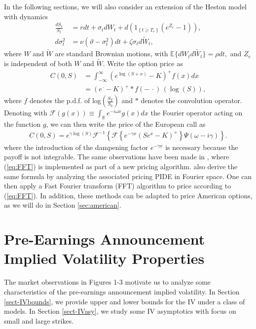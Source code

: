 \documentclass[11pt]{article}
\numberwithin{equation}{section}
\numberwithin{theorem}{section}
\begin{document}
In the following sections, we will also consider an extension of the
Heston model with dynamics
\begin{align}
\frac{dS_{t}}{S_{t}} & =r dt+\sigma_{t}dW_{t}+d\left(1_{\left\{ t\geq T_{e}\right\} }\left(e^{Z_{e}}-1\right)\right),\nonumber \\
d\sigma_{t}^{2} & = \nu \left(\vartheta-\sigma_{t}^{2}\right)dt+\zeta\sigma_{t}d\tilde{W}_{t},\label{eq:heston_dyn}
\end{align}
where $W$ and $\tilde{W}$ are standard Brownian motions, with $\mathbb{E}\{dW_{t}d\tilde{W_{t}}\}=\rho dt,$
and $Z_{e}$ is independent of both $W$ and $\tilde{W}$. Write the option price as
\begin{align*}
C\left(0,S\right) & =  \int_{-\infty}^{\infty}\left(e^{{\log}\left(S+x\right)}-K\right)^+f(x)dx \\
& =  \left(e^{\,\cdot}-K\right)^+\ast f(-\,\cdot)\,\left({\log}(S)\right),
\end{align*} 
where $f$ denotes the p.d.f. of log$(\frac{S_T}{S_0})$ and $\ast$ denotes the convolution operator. 
Denoting with
$\mathcal{F}\left(g\left(x\right)\right)\equiv\int_{\mathbb{R}}e^{-i\omega x}g\left(x\right)dx$
the Fourier operator acting on the function $g$, we can then write the
price of the European call as 
\begin{eqnarray}
C\left(0,S\right)=e^{\gamma {\log}(S)}\mathcal{F}^{-1}\left\{\mathcal{F}\left\{e^{-\gamma x}\left(Se^{x}-K\right)^{+}\right\}\Psi\left(\omega-i\gamma\right)\right\}.\label{eq:FFT}
\end{eqnarray}
where the introduction of the dampening factor $e^{-\gamma x}$ is necessary because the payoff is not integrable. The same observations have been  made in \citet{Lord08afast}, where    (\ref{eq:FFT}) is implemented as part of a new  pricing algorithm. \citet{Jackson2008} also derive the same formula by analyzing the associated pricing PIDE in Fourier space. One can then apply a Fast Fourier transform (FFT) algorithm to price according to (\ref{eq:FFT}). In addition,  these methods can be adapted to price American options, as we will do in Section \ref{sec:american}.


\section{Pre-Earnings Announcement Implied Volatility Properties\label{sec:IV}}\label{sect-IVbehave}
The market observations in Figures 1-3 motivate us to   analyze some characteristics of the pre-earnings announcement implied volatility.  In Section \ref{sect-IVbounds}, we provide  upper and lower
bounds for the IV under a class of models.  
In Section \ref{sect-IVasy},  we study some IV asymptotics  with focus on   small and large strikes. 
\end{document}
